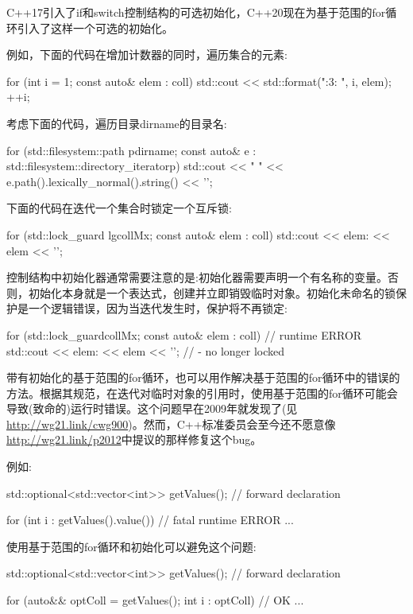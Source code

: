 
C++17引入了if和switch控制结构的可选初始化，C++20现在为基于范围的for循环引入了这样一个可选的初始化。

例如，下面的代码在增加计数器的同时，遍历集合的元素:

\begin{cpp}
for (int i = 1; const auto& elem : coll) {
	std::cout << std::format("{:3}: {}\n", i, elem);
	++i;
}
\end{cpp}

考虑下面的代码，遍历目录dirname的目录名:

\begin{cpp}
for (std::filesystem::path p{dirname};
const auto& e : std::filesystem::directory_iterator{p}) {
	std::cout << " " << e.path().lexically_normal().string() << '\n';
}
\end{cpp}

下面的代码在迭代一个集合时锁定一个互斥锁:

\begin{cpp}
for (std::lock_guard lg{collMx}; const auto& elem : coll) {
	std::cout << elem: << elem << '\n';
}
\end{cpp}

控制结构中初始化器通常需要注意的是:初始化器需要声明一个有名称的变量。否则，初始化本身就是一个表达式，创建并立即销毁临时对象。初始化未命名的锁保护是一个逻辑错误，因为当迭代发生时，保护将不再锁定:

\begin{cpp}
for (std::lock_guard{collMx}; const auto& elem : coll) { // runtime ERROR
	std::cout << elem: << elem << '\n'; // - no longer locked
}
\end{cpp}

带有初始化的基于范围的for循环，也可以用作解决基于范围的for循环中的错误的方法。根据其规范，在迭代对临时对象的引用时，使用基于范围的for循环可能会导致(致命的)运行时错误。这个问题早在2009年就发现了(见\url{http://wg21.link/cwg900})。然而，C++标准委员会至今还不愿意像\url{http://wg21.link/p2012}中提议的那样修复这个bug。

例如:

\begin{cpp}
std::optional<std::vector<int>> getValues(); // forward declaration

for (int i : getValues().value()) { // fatal runtime ERROR
	...
}
\end{cpp}

使用基于范围的for循环和初始化可以避免这个问题:

\begin{cpp}
std::optional<std::vector<int>> getValues(); // forward declaration

for (auto&& optColl = getValues(); int i : optColl) { // OK
	...
}
\end{cpp}

